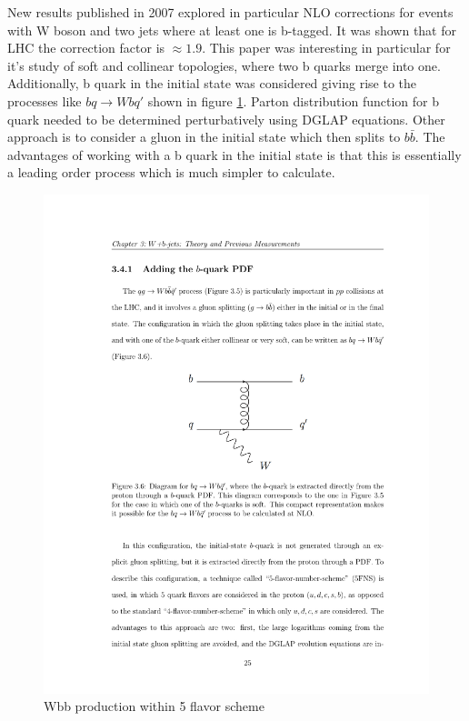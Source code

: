 \par New results published in 2007 explored in particular NLO corrections for events with W boson and two jets where at least one is b-tagged. It was shown that for LHC the correction factor is $\approx 1.9$. This paper was interesting in particular for it's study of soft and collinear topologies, where two b quarks merge into one. Additionally, b quark in the initial state was considered giving rise to the processes like $bq\rightarrow Wbq'$ shown in figure \ref{fig:5FS_diag}. Parton distribution function for b quark needed to be determined perturbatively using DGLAP equations. Other approach is to consider a gluon in the initial state which then splits to $b\bar{b}$. The advantages of working with a b quark in the initial state is that this is essentially a leading order process which is much simpler to calculate. 

\begin{figure}[htbp]
	\centering
		\includegraphics{Figures/5FS_diag.pdf}
	\caption[Wbb production within 5 flavor scheme]{Wbb production within 5 flavor scheme}
	\label{fig:5FS_diag}
\end{figure}

